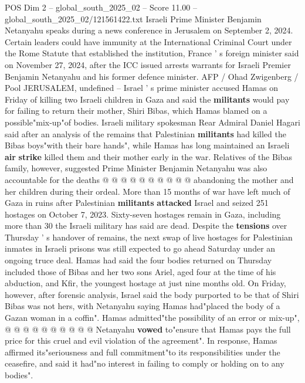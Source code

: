 \begin{textsample}{POS Dim 2 – global\_south\_2025\_02 – Score 11.00 – global\_south\_2025\_02/121561422.txt}  \label{ex:f2_pos_376}
Israeli Prime Minister Benjamin Netanyahu speaks during a news conference in Jerusalem on September 2, 2024.
Certain leaders could have immunity at the International Criminal Court under the Rome Statute that established the institution, France ' s foreign minister said on November 27, 2024, after the ICC issued arrests warrants for Israeli Premier Benjamin Netanyahu and his former defence minister.
AFP / Ohad Zwigenberg / Pool JERUSALEM, undefined -- Israel ' s prime minister accused Hamas on Friday of killing two Israeli children in Gaza and said the \textbf{militants} would pay for failing to return their mother, Shiri Bibas, which Hamas blamed on a possible"mix-up"of bodies.
Israeli military spokesman Rear Admiral Daniel Hagari said after an analysis of the remains that Palestinian \textbf{militants} had killed the Bibas boys"with their bare hands", while Hamas has long maintained an Israeli \textbf{air} \textbf{strike} killed them and their mother early in the war.
Relatives of the Bibas family, however, suggested Prime Minister Benjamin Netanyahu was also accountable for the deaths @ @ @ @ @ @ @ @ @ @ abandoning the mother and her children during their ordeal.
More than 15 months of war have left much of Gaza in ruins after Palestinian \textbf{militants} \textbf{attacked} Israel and seized 251 hostages on October 7, 2023.
Sixty-seven hostages remain in Gaza, including more than 30 the Israeli military has said are dead.
Despite the \textbf{tensions} over Thursday ' s handover of remains, the next swap of live hostages for Palestinian inmates in Israeli prisons was still expected to go ahead Saturday under an ongoing truce deal.
Hamas had said the four bodies returned on Thursday included those of Bibas and her two sons Ariel, aged four at the time of his abduction, and Kfir, the youngest hostage at just nine months old.
On Friday, however, after forensic analysis, Israel said the body purported to be that of Shiri Bibas was not hers, with Netanyahu saying Hamas had"placed the body of a Gazan woman in a coffin".
Hamas admitted"the possibility of an error or mix-up", @ @ @ @ @ @ @ @ @ @ Netanyahu \textbf{vowed} to"ensure that Hamas pays the full price for this cruel and evil violation of the agreement".
In response, Hamas affirmed its"seriousness and full commitment"to its responsibilities under the ceasefire, and said it had"no interest in failing to comply or holding on to any bodies".

\end{textsample}

